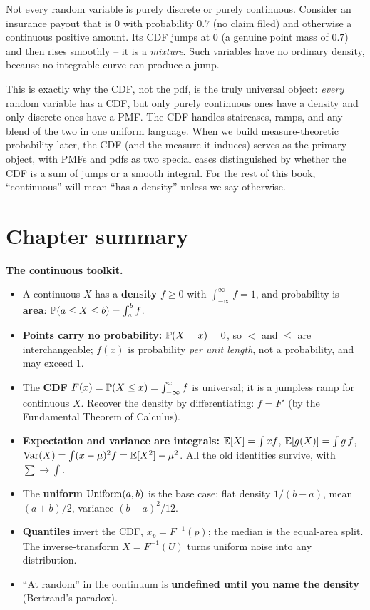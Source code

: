 Not every random variable is purely discrete or purely continuous. Consider an
insurance payout that is $0$ with probability $0.7$ (no claim filed) and otherwise a
continuous positive amount. Its CDF jumps at $0$ (a genuine point mass of $0.7$) and
then rises smoothly -- it is a \emph{mixture}. Such variables have no ordinary
density, because no integrable curve can produce a jump.

\begin{marginnotebox}
This is exactly why the CDF, not the pdf, is the truly universal object: \emph{every}
random variable has a CDF, but only purely continuous ones have a density and only
discrete ones have a PMF. The CDF handles staircases, ramps, and any blend of the two
in one uniform language. When we build measure-theoretic probability later, the CDF
(and the measure it induces) serves as the primary object, with PMFs and pdfs as two special
cases distinguished by whether the CDF is a sum of jumps or a smooth integral. For
the rest of this book, ``continuous'' will mean ``has a density'' unless we say
otherwise.
\end{marginnotebox}

\section{Chapter summary}
\label{ch10:summary}

\begin{focusbox}
\textbf{The continuous toolkit.}
\begin{itemize}
\item A continuous $X$ has a \textbf{density} $f \ge 0$ with $\int_{-\infty}^\infty
      f = 1$, and probability is \textbf{area}: $\P(a\le X\le b)=\int_a^b f$.
\item \textbf{Points carry no probability:} $\P(X=x)=0$, so $<$ and $\le$ are
      interchangeable; $f(x)$ is probability \emph{per unit length}, not a
      probability, and may exceed $1$.
\item The \textbf{CDF} $F(x)=\P(X\le x)=\int_{-\infty}^x f$ is universal; it is a
      jumpless ramp for continuous $X$. Recover the density by differentiating:
      $f = F'$ (by the Fundamental Theorem of Calculus).
\item \textbf{Expectation and variance are integrals:} $\E[X]=\int x f$,
      $\E[g(X)]=\int g\,f$, $\Var(X)=\int(x-\mu)^2 f = \E[X^2]-\mu^2$. All the old
      identities survive, with $\sum \to \int$.
\item The \textbf{uniform} $\Unif(a,b)$ is the base case: flat density
      $1/(b-a)$, mean $(a+b)/2$, variance $(b-a)^2/12$.
\item \textbf{Quantiles} invert the CDF, $x_p=F^{-1}(p)$; the median is the
      equal-area split. The inverse-transform $X=F^{-1}(U)$ turns uniform noise into
      any distribution.
\item ``At random'' in the continuum is \textbf{undefined until you name the
      density} (Bertrand's paradox).
\end{itemize}
\end{focusbox}

